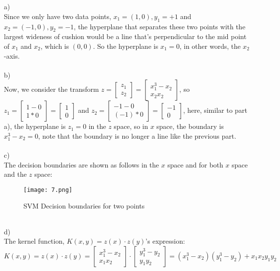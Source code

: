 \documentclass[12pt]{article}
\newcommand{\D}{\displaystyle}
\begin{document}
 \\\\
a)\\
\indent Since we only have two data points, $x_1 = (1,0), y_1 = +1$ and $x_2 = (-1,0), y_2 = -1$, the hyperplane that separates these two points with the largest wideness of cushion would be a line that's perpendicular to the mid point of $x_1$ and $x_2$, which is $(0,0)$. So the hyperplane is $x_1 = 0$, in other words, the $x_2$-axis.\\\\
b)\\
\indent Now, we consider the transform $\D z = \begin{bmatrix} z_1\\z_2 \end{bmatrix} =  \begin{bmatrix}  x_1^3 - x_2\\x_2x_2 \end{bmatrix}$, so $\D z_1 = \begin{bmatrix}  1 - 0\\1*0 \end{bmatrix} = \begin{bmatrix}  1\\0 \end{bmatrix}$ and $\D z_2 = \begin{bmatrix}  -1 - 0\\(-1)*0 \end{bmatrix} = \begin{bmatrix}  -1\\0 \end{bmatrix}$, here, similar to part a), the hyperplane is $z_1 = 0$ in the $z$ space, so in $x$ space, the boundary is $x_1^3 - x_2 = 0$, note that the boundary is no longer a line like the previous part.\\\\
c)\\
\indent The decision boundaries are shown as follows in the $x$ space and for both $x$ space and the $z$ space:
\begin{figure}[H]
  \centering
  \texttt{[image: 7.png]}
  \caption{SVM Decision boundaries for two points }
  \label{fig:1}
\end{figure}\indent\\
d)\\
\indent The kernel function, $K(x,y) = z(x)\cdot z(y)$'s expression: $$K(x,y) = z(x)\cdot  z(y) =  \begin{bmatrix} x_1^3-x_2\\x_1 x_2 \end{bmatrix} \cdot  \begin{bmatrix} y_1^3-y_2\\y_1y_2 \end{bmatrix} = (x_1^3 - x_2)(y_1^3-y_2)+x_1x_2y_1y_2$$
\end{document}
